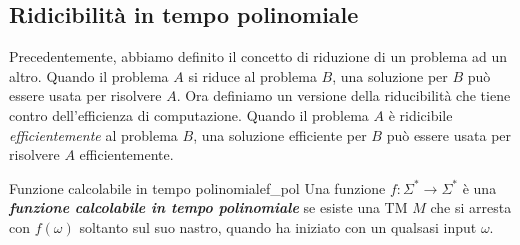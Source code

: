 \documentclass[12pt]{report}
\newcounter{definition}
\newcommand{\nmu}{}
\begin{document}
\subsection{Ridicibilità in tempo polinomiale}
Precedentemente, abbiamo definito il concetto di riduzione di un problema ad un altro. Quando il problema $A$ si riduce al problema $B$, una soluzione per $B$ può essere usata per risolvere $A$. Ora definiamo un versione della riducibilità che tiene contro dell'efficienza di computazione. Quando il problema $A$ è ridicibile \textit{efficientemente} al problema $B$, una soluzione efficiente per $B$ può essere usata per risolvere  $A$ efficientemente.

\begin{definition}{\nmu Funzione calcolabile in tempo polinomiale}{f_pol}
	Una funzione $f: \Sigma^* \to \Sigma^*$ è una \textbf{\textit{funzione calcolabile in tempo polinomiale}} se esiste una TM $M$ che si arresta con $f(\omega)$ soltanto sul suo nastro, quando ha iniziato con un qualsasi input $\omega$.
\end{definition}
\end{document}
